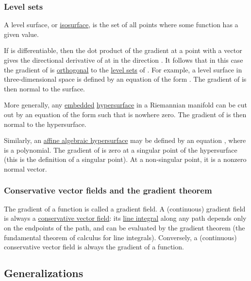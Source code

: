\documentclass[
]{article}
\begin{document}
\hypertarget{level_sets}{%
\subsubsection{Level sets}\label{level_sets}}

A level surface, or \url{isosurface}, is the set of all points where
some function has a given value.

If is differentiable, then the dot product of the gradient at a point
with a vector gives the directional derivative of at in the direction .
It follows that in this case the gradient of is \url{orthogonal} to the
\href{level_set}{level sets} of . For example, a level surface in
three-dimensional space is defined by an equation of the form . The
gradient of is then normal to the surface.

More generally, any \href{embedded_submanifold}{embedded}
\url{hypersurface} in a Riemannian manifold can be cut out by an
equation of the form such that is nowhere zero. The gradient of is then
normal to the hypersurface.

Similarly, an \href{affine_algebraic_variety}{affine algebraic
hypersurface} may be defined by an equation , where is a polynomial. The
gradient of is zero at a singular point of the hypersurface (this is the
definition of a singular point). At a non-singular point, it is a
nonzero normal vector.

\hypertarget{conservative_vector_fields_and_the_gradient_theorem}{%
\subsubsection{Conservative vector fields and the gradient
theorem}\label{conservative_vector_fields_and_the_gradient_theorem}}

The gradient of a function is called a gradient field. A (continuous)
gradient field is always a \href{conservative_vector_field}{conservative
vector field}: its \href{line_integral}{line integral} along any path
depends only on the endpoints of the path, and can be evaluated by the
gradient theorem (the fundamental theorem of calculus for line
integrals). Conversely, a (continuous) conservative vector field is
always the gradient of a function.

\hypertarget{generalizations}{%
\subsection{Generalizations}\label{generalizations}}
\end{document}
